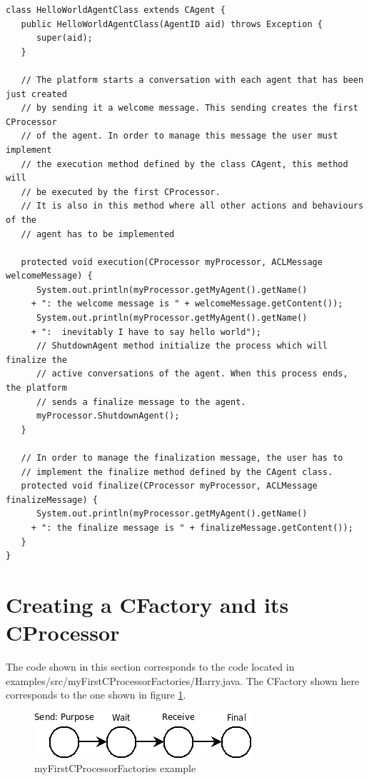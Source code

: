 \begin{lstlisting}[style=Java]
class HelloWorldAgentClass extends CAgent {
   public HelloWorldAgentClass(AgentID aid) throws Exception {
      super(aid);
   }

   // The platform starts a conversation with each agent that has been just created
   // by sending it a welcome message. This sending creates the first CProcessor
   // of the agent. In order to manage this message the user must implement
   // the execution method defined by the class CAgent, this method will
   // be executed by the first CProcessor.
   // It is also in this method where all other actions and behaviours of the
   // agent has to be implemented

   protected void execution(CProcessor myProcessor, ACLMessage welcomeMessage) {
      System.out.println(myProcessor.getMyAgent().getName()
	 + ": the welcome message is " + welcomeMessage.getContent());
      System.out.println(myProcessor.getMyAgent().getName()
	 + ":  inevitably I have to say hello world");
      // ShutdownAgent method initialize the process which will finalize the
      // active conversations of the agent. When this process ends, the platform
      // sends a finalize message to the agent.
      myProcessor.ShutdownAgent();
   }

   // In order to manage the finalization message, the user has to
   // implement the finalize method defined by the CAgent class.
   protected void finalize(CProcessor myProcessor, ACLMessage finalizeMessage) {
      System.out.println(myProcessor.getMyAgent().getName()
	 + ": the finalize message is " + finalizeMessage.getContent());
   }
}
\end{lstlisting}

\section{Creating a CFactory and its CProcessor}
\label{subsec:cprocessor}
The code shown in this section corresponds to the code located in examples/src/myFirstCProcessorFactories/Harry.java. The CFactory shown here corresponds to the one shown in figure \ref{img:cfactory}.

\begin{figure}[!h]
\centering
\includegraphics[scale=0.6]{ProgrammingAgents/images/cfactory}
\caption{myFirstCProcessorFactories example}
\label{img:cfactory}
\end{figure}

